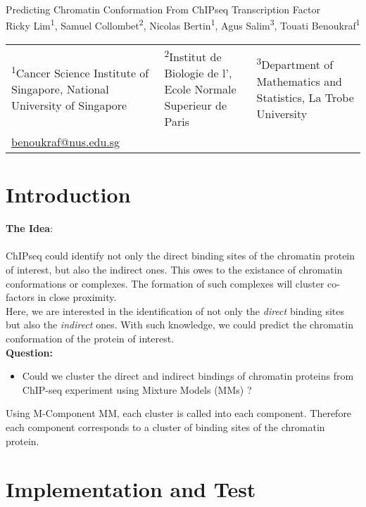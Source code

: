 \documentclass{article}\usepackage[]{graphicx}\usepackage[]{color}
\newcommand\Mark[1]{\textsuperscript#1}
\begin{document}
\begingroup
\centering
{\LARGE Predicting Chromatin Conformation From ChIPseq Transcription Factor\\[1.5em]
\large Ricky Lim\Mark{1}, Samuel Collombet\Mark{2}, Nicolas Bertin\Mark{1}, Agus Salim\Mark{3}, Touati Benoukraf\Mark{1}}\\[1em]
\begin{tabular}{*{3}{>{\centering}p{}}}
    \Mark{1}Cancer Science Institute of Singapore, National University of Singapore&\Mark{2}Institut de Biologie de l', Ecole Normale Superieur de Paris& \Mark{3}Department of Mathematics and Statistics, La Trobe University& \tabularnewline
\url{benoukraf@nus.edu.sg}
\end{tabular}\par
\endgroup

\section{Introduction}

\textbf{The Idea}:
\\ 
\\
ChIPseq could identify not only the direct binding sites of the chromatin protein of interest, but also the indirect ones. 
This owes to the existance of chromatin conformations or complexes. The formation of such complexes will cluster co-factors in close proximity.
\\ 
Here, we are interested in the identification of not only the \textit{direct} binding sites but also the \textit{indirect} ones. With such knowledge, we could predict the chromatin conformation of the protein of interest.
\\

\textbf{Question:} 
\begin{itemize}
    \item Could we cluster the direct and indirect bindings of chromatin proteins from ChIP-seq experiment using Mixture Models (MMs) ?

\end{itemize}
    
    Using M-Component MM, each cluster is called into each component. Therefore each component corresponds to a cluster of binding sites of the chromatin protein.

\section{Implementation and Test}
\end{document}
